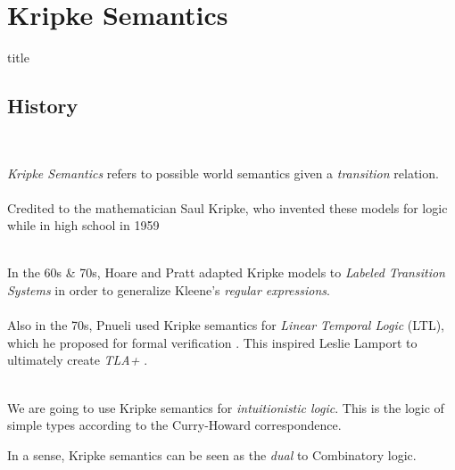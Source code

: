 \documentclass{beamer}
\begin{document}
\section{Kripke Semantics}
\begin{frame}[plain]
  \vfill \centering
  \begin{beamercolorbox}[sep=8pt,center,shadow=true,rounded=true]{title}
    \insertsectionhead\par%
  \end{beamercolorbox}
  \vfill
\end{frame}

\subsection{History}
\begin{frame}[allowframebreaks]{\insertsectionhead\ \textemdash\
    \insertsubsectionhead}

\emph{Kripke Semantics} refers to possible world semantics given a \emph{transition} relation.\\~\\

Credited to the mathematician Saul Kripke, who invented these models for logic while in high school in 1959 \cite{kripkeCompletenessTheoremModal1959}\\~\\

\framebreak

In the 60s \& 70s, Hoare \cite{hoareAxiomaticBasisComputer1969} and Pratt \cite{prattSemanticalConsiderationsFloydHoare1976} adapted Kripke models to \emph{Labeled Transition Systems} in order to generalize Kleene's \emph{regular expressions}. \\~\\

Also in the 70s, Pnueli used Kripke semantics for \emph{Linear Temporal Logic} (LTL), which he proposed for formal verification \cite{pnueliTemporalLogicPrograms1977}.  This inspired Leslie Lamport to ultimately create \emph{TLA+} \cite{lamportSpecifyingConcurrentSystems1999}. \\~\\

\framebreak

We are going to use Kripke semantics for \emph{intuitionistic logic}. This is the logic of simple types according to the Curry-Howard correspondence.

In a sense, Kripke semantics can be seen as the \emph{dual} to Combinatory logic.

\end{frame}
\end{document}
